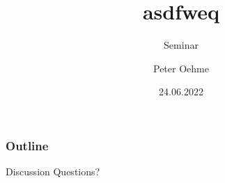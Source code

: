 \documentclass{beamer}
\title{asdfweq}
\subtitle{Seminar}
\author{Peter Oehme}
\date{24.06.2022}
\begin{document}
    \frame{\titlepage}

    \begin{frame}
        \frametitle{Outline}
        \tableofcontents
    \end{frame}

    

    

    

    

    \printbibliography{}

    \begin{frame}{Discussion}
        Questions?
    \end{frame}
\end{document}
